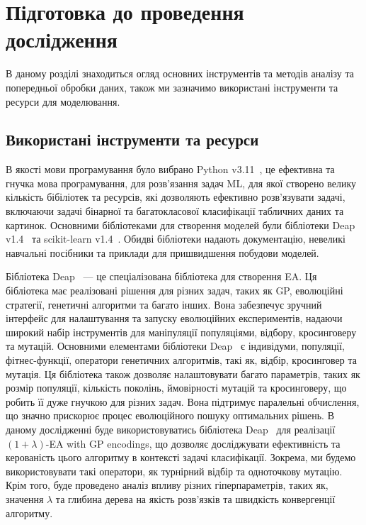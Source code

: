 \chapter{Підготовка до проведення дослідження}
\label{chap:theory}

В даному розділі знаходиться огляд основних інструментів та методів аналізу та попередньої обробки даних, також ми зазначимо використані інструменти та ресурси для моделювання.

\section{Використані інструменти та ресурси}

В якості мови програмування було вибрано Python v3.11~\cite{ct18}, це ефективна та гнучка мова програмування, для розв'язання задач ML, для якої створено велику кількість бібіліотек та ресурсів, які дозволяють ефективно розв'язувати задачі, включаючи задачі бінарної та багатокласової класифікації табличних даних та картинок. Основними бібліотеками для створення моделей були бібліотеки Deap v1.4~\cite{ct19} та scikit-learn v1.4~\cite{ct20}. Обидві бібліотеки надають документацію, невеликі навчальні посібники та приклади для пришвидшення побудови моделей.

Бібліотека Deap~\cite{ct19} --- це спеціалізована бібліотека для створення EA. Ця бібліотека має реалізовані рішення для різних задач, таких як GP, еволюційні стратегії, генетичні алгоритми та багато інших. Вона забезпечує зручний інтерфейс для налаштування та запуску еволюційних експериментів, надаючи широкий набір інструментів для маніпуляції популяціями, відбору, кросинговеру та мутацій. Основними елементами бібліотеки Deap~\cite{ct19} є індивідуми, популяції, фітнес-функції, оператори генетичних алгоритмів, такі як, відбір, кросинговер та мутація. Ця бібліотека також дозволяє налаштовувати багато параметрів, таких як розмір популяції, кількість поколінь, ймовірності мутацій та кросинговеру, що робить її дуже гнучкою для різних задач. Вона підтримує паралельні обчислення, що значно прискорює процес еволюційного пошуку оптимальних рішень. В даному дослідженні буде використовуватись бібліотека Deap~\cite{ct19} для реалізації $(1+\lambda)$-EA with GP encodings, що дозволяє досліджувати ефективність та керованість цього алгоритму в контексті задачі класифікації. Зокрема, ми будемо використовувати такі оператори, як турнірний відбір та одноточкову мутацію. Крім того, буде проведено аналіз впливу різних гіперпараметрів, таких як, значення $\lambda$ та глибина дерева на якість розв'язків та швидкість конвергенції алгоритму.

